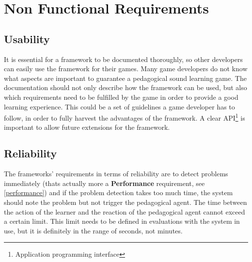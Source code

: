 

\section{Non Functional Requirements}
\label{non-functional-requirements}

\subsection{Usability}
It is essential for a framework to be  documented thoroughly, so other
developers can easily use the framework for their games. Many game
developers do not know what aspects are important to guarantee a pedagogical
sound learning game. The documentation should not only describe how the framework
can be used, but also which requirements
need to be fulfilled by the game in order to provide a good learning
experience. This could be a set of guidelines a game developer has to follow, in order
to fully harvest the advantages of the framework. A clear
API\footnote{Application programming interface} is important to allow future extensions
for the framework.

\subsection{Reliability}
The frameworks' requirements in terms of reliability are to detect problems
immediately (thats actually more a \textbf{Performance} requirement, see
\ref{performance}) and if the problem detection takes too much time, the
system should note the problem but not trigger the pedagogical agent. The time
between the action of the learner and the reaction of the pedagogical agent
cannot exceed a certain limit. This limit needs to be defined in evaluations
with the system in use, but it is definitely in the range of seconds, not
minutes.

